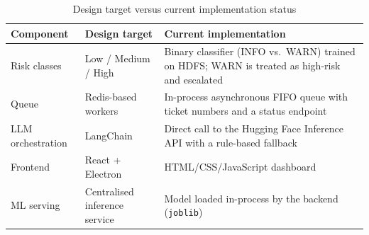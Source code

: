 \documentclass[12pt,a4paper]{report}
\renewcommand{\arraystretch}{1.05}
\begin{document}
\begin{table}[H]
\centering
\caption{Design target versus current implementation status}
\label{tab:status}
\small
\renewcommand{\arraystretch}{1.2}
\begin{tabularx}{\textwidth}{>{\raggedright\arraybackslash}p{3cm} >{\raggedright\arraybackslash}X >{\raggedright\arraybackslash}X}
\toprule
\textbf{Component} & \textbf{Design target} & \textbf{Current implementation}\\
\midrule
Risk classes & Low / Medium / High & Binary classifier (INFO vs.\ WARN) trained on HDFS; WARN is treated as high-risk and escalated\\
Queue & Redis-based workers & In-process asynchronous FIFO queue with ticket numbers and a status endpoint\\
LLM orchestration & LangChain & Direct call to the Hugging Face Inference API with a rule-based fallback\\
Frontend & React + Electron & HTML/CSS/JavaScript dashboard\\
ML serving & Centralised inference service & Model loaded in-process by the backend (\texttt{joblib})\\
\bottomrule
\end{tabularx}
\end{table}
\end{document}
